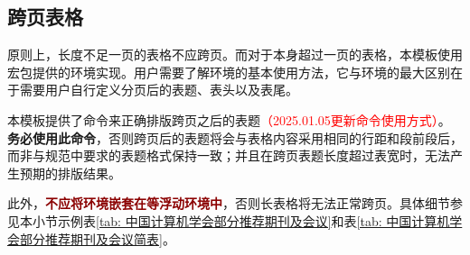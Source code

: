 \documentclass[doctor, vlined, ]{DissertUESTC}
\begin{document}
	
	\clearpage
	\subsection{跨页表格}
	
	原则上，长度不足一页的表格不应跨页。而对于本身超过一页的表格，本模板使用\href{https://mirrors.tuna.tsinghua.edu.cn/CTAN/macros/latex/required/tools/longtable.pdf}{\ttfamily\color{DarkRed}}宏包提供的环境实现。用户需要了解环境的基本使用方法，它与环境的最大区别在于需要用户自行定义分页后的表题、表头以及表尾。
	
	本模板提供了命令来正确排版跨页之后的表题\textcolor{red}{（2025.01.05更新命令使用方式）}。\textbf{务必使用此命令}，否则跨页后的表题将会与表格内容采用相同的行距和段前段后，而非与规范中要求的表题格式保持一致；并且在跨页表题长度超过表宽时，无法产生预期的排版结果。
	
	此外，\textbf{\textcolor{DarkRed}{不应将环境嵌套在等浮动环境中}}，否则长表格将无法正常跨页。具体细节参见本小节示例表\ref{tab: 中国计算机学会部分推荐期刊及会议}和表\ref{tab: 中国计算机学会部分推荐期刊及会议简表}。
	
\end{document}
